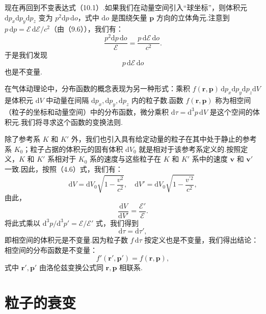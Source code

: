 现在再回到不变表达式（10.1）.如果我们在动量空间引入“球坐标”，则体积元 $\mathrm{d}p_x\mathrm{d}p_y\mathrm{d}p_z$ 变为 $p^2\mathrm{d}p\,\mathrm{d}o$，式中 $\mathrm{d}o$ 是围绕矢量 $\boldsymbol{p}$ 方向的立体角元.注意到 $p\,\mathrm{d}p=\mathcal{E}\,\mathrm{d}\mathcal{E}/c^2$（由（9.6）），我们有：
\begin{equation*}
  \frac{p^2\mathrm{d}p\,\mathrm{d}o}{\mathcal{E}}
  =\frac{p\,\mathrm{d}\mathcal{E}\,\mathrm{d}o}{c^2}.
\end{equation*}
于是我们发现
\begin{equation}
  p\,\mathrm{d}\mathcal{E}\,\mathrm{d}o
\end{equation}
也是不变量.

在气体动理论中，分布函数的概念表现为另一种形式：乘积 $f(\boldsymbol{r},\boldsymbol{p})\,\mathrm{d}p_x\mathrm{d}p_y\mathrm{d}p_z\mathrm{d}V$ 是体积元 $\mathrm{d}V$ 中动量在间隔 $\mathrm{d}p_x,\mathrm{d}p_y,\mathrm{d}p_z$ 内的粒子数.函数 $f(\boldsymbol{r},\boldsymbol{p})$ 称为相空间（粒子的坐标和动量空间）中的分布函数，微分乘积 $\mathrm{d}\tau=\mathrm{d}^3p\,\mathrm{d}V$ 是这个空间的体积元.我们将寻求这个函数的变换法则.

除了参考系 $K$ 和 $K'$ 外，我们也引入具有给定动量的粒子在其中处于静止的参考系 $K_0$；粒子占据的体积元的固有体积 $\mathrm{d}V_0$ 就是相对于该参考系定义的.按照定义，$K$ 和 $K'$ 系相对于 $K_0$ 系的速度与这些粒子在 $K$ 和 $K'$ 系中的速度 $\boldsymbol{v}$ 和 $\boldsymbol{v}'$ 一致.因此，按照（4.6）式，我们有：
\begin{equation*}
  \mathrm{d}V=\mathrm{d}V_0\sqrt{1-\frac{v^2}{c^2}},\quad
  \mathrm{d}V'=\mathrm{d}V_0\sqrt{1-\frac{v^{\prime 2}}{c^2}},
\end{equation*}
由此，
\begin{equation*}
  \frac{\mathrm{d}V}{\mathrm{d}V'}=\frac{\mathcal{E}'}{\mathcal{E}}.
\end{equation*}
将此式乘以 $\mathrm{d}^3p/\mathrm{d}^3p'=\mathcal{E}/\mathcal{E}'$ 式，我们得到
\begin{equation}
  \mathrm{d}\tau=\mathrm{d}\tau',
\end{equation}
即相空间的体积元是不变量.因为粒子数 $f\,\mathrm{d}\tau$ 按定义也是不变量，我们得出结论：相空间的分布函数是不变量：
\begin{equation}
  f'(\boldsymbol{r}',\boldsymbol{p}')=f(\boldsymbol{r},\boldsymbol{p}),
\end{equation}
式中 $\boldsymbol{r}',\boldsymbol{p}'$ 由洛伦兹变换公式同 $\boldsymbol{r},\boldsymbol{p}$ 相联系.

\section{粒子的衰变}

